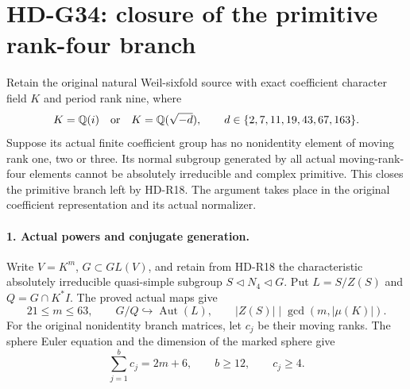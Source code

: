 \section{HD-G34: closure of the primitive rank-four branch}
\label{sec:primitive-rank-four-finite-closure}

Retain the original natural Weil-sixfold source with exact
coefficient character field \(K\) and period rank nine, where
\[
 K=\mathbb Q(i)\quad\hbox{or}\quad K=\mathbb Q(\sqrt{-d}),
 \qquad d\in\{2,7,11,19,43,67,163\}.
\]
Suppose its actual finite
coefficient group has no nonidentity element of moving rank
one, two or three. Its normal subgroup generated by all actual
moving-rank-four elements cannot be absolutely irreducible and
complex primitive. This closes the primitive branch left by
HD-R18. The argument takes place in the original coefficient
representation and its actual normalizer.

\paragraph{1. Actual powers and conjugate generation.}
Write \(V=K^m\), \(G\subset GL(V)\), and retain from HD-R18
the characteristic absolutely irreducible quasi-simple subgroup
\(S\triangleleft N_4\triangleleft G\). Put
\(L=S/Z(S)\) and \(Q=G\cap K^*I\). The proved actual maps give
\[
 21\le m\le63,\qquad G/Q\hookrightarrow\operatorname{Aut}(L),
 \qquad |Z(S)|\mid\gcd(m,|\mu(K)|).                 \tag{G34.1}
\]
For the original nonidentity branch matrices, let \(c_j\)
be their moving ranks. The sphere Euler equation and the
dimension of the marked sphere give
\[
       \sum_{j=1}^b c_j=2m+6,\qquad b\ge12,
       \qquad c_j\ge4.                              \tag{G34.2}
\]

